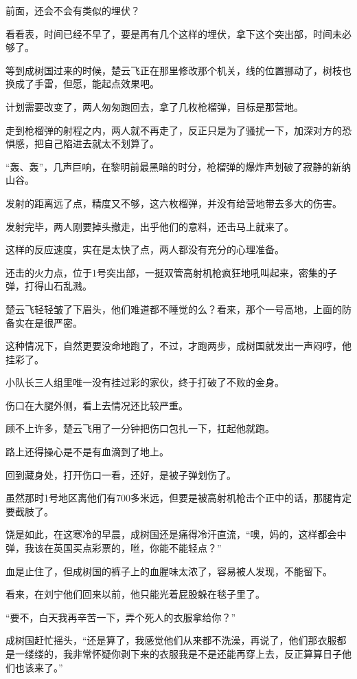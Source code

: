 前面，还会不会有类似的埋伏？

看看表，时间已经不早了，要是再有几个这样的埋伏，拿下这个突出部，时间未必够了。

等到成树国过来的时候，楚云飞正在那里修改那个机关，线的位置挪动了，树枝也换成了手雷，但愿，能起点效果吧。

计划需要改变了，两人匆匆跑回去，拿了几枚枪榴弹，目标是那营地。

走到枪榴弹的射程之内，两人就不再走了，反正只是为了骚扰一下，加深对方的恐惧感，把自己陷进去就太不划算了。

“轰、轰”，几声巨响，在黎明前最黑暗的时分，枪榴弹的爆炸声划破了寂静的新纳山谷。

发射的距离远了点，精度又不够，这六枚榴弹，并没有给营地带去多大的伤害。

发射完毕，两人刚要掉头撤走，出乎他们的意料，还击马上就来了。

这样的反应速度，实在是太快了点，两人都没有充分的心理准备。

还击的火力点，位于1号突出部，一挺双管高射机枪疯狂地吼叫起来，密集的子弹，打得山石乱溅。

楚云飞轻轻皱了下眉头，他们难道都不睡觉的么？看来，那个一号高地，上面的防备实在是很严密。

这种情况下，自然更要没命地跑了，不过，才跑两步，成树国就发出一声闷哼，他挂彩了。

小队长三人组里唯一没有挂过彩的家伙，终于打破了不败的金身。

伤口在大腿外侧，看上去情况还比较严重。

顾不上许多，楚云飞用了一分钟把伤口包扎一下，扛起他就跑。

路上还得操心是不是有血滴到了地上。

回到藏身处，打开伤口一看，还好，是被子弹划伤了。

虽然那时1号地区离他们有700多米远，但要是被高射机枪击个正中的话，那腿肯定要截肢了。

饶是如此，在这寒冷的早晨，成树国还是痛得冷汗直流，“噢，妈的，这样都会中弹，我该在英国买点彩票的，咝，你能不能轻点？”

血是止住了，但成树国的裤子上的血腥味太浓了，容易被人发现，不能留下。

看来，在刘宁他们回来以前，他只能光着屁股躲在毯子里了。

“要不，白天我再辛苦一下，弄个死人的衣服拿给你？”

成树国赶忙摇头，“还是算了，我感觉他们从来都不洗澡，再说了，他们那衣服都是一缕缕的，我非常怀疑你剥下来的衣服我是不是还能再穿上去，反正算算日子他们也该来了。”

